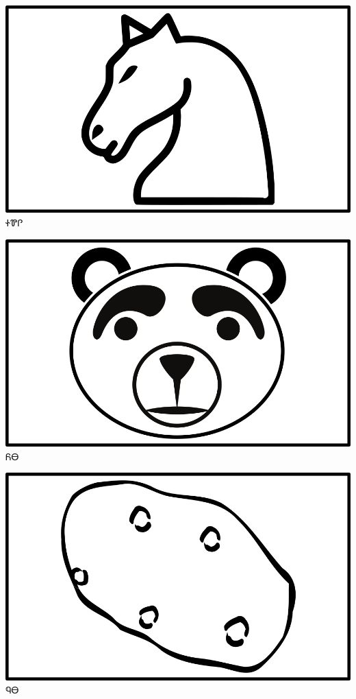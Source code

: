 \documentclass[avery5371]{flashcards}%
\begin{document}
    \begin{flashcard}{
        \includegraphics[width=0.95\columnwidth,height=.51\columnwidth,keepaspectratio]{../artwork/objects-animate/soquili}
    }
        \Huge ᏐᏈᎵ
    \end{flashcard}

    \begin{flashcard}{
        \includegraphics[width=0.95\columnwidth,height=.51\columnwidth,keepaspectratio]{../artwork/objects-animate/yona}
    }
        \Huge ᏲᎾ
    \end{flashcard}


    \begin{flashcard}{
        \includegraphics[width=0.95\columnwidth,height=.51\columnwidth,keepaspectratio]{../artwork/objects-neutral/nuna}
    }
        \Huge ᏄᎾ
    \end{flashcard}
\end{document}
